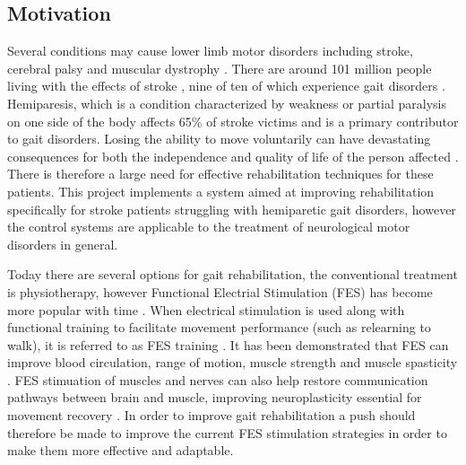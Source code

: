 



\subsection{Motivation}

Several conditions may cause lower limb motor disorders including stroke, cerebral palsy and muscular dystrophy \cite{hayami_development_2022}. There are around 101 million people living with the effects of stroke \cite{noauthor_key_nodate}, nine of ten of which experience gait disorders \cite{schaechter_motor_2004}. Hemiparesis, which is a condition characterized by weakness or partial paralysis on one side of the body affects 65\% of stroke victims \cite{wist_muscle_2016} and is a primary contributor to gait disorders. Losing the ability to move voluntarily can have devastating consequences for both the independence and quality of life of the person affected \cite{marquez-chin_functional_2020}. There is therefore a large need for effective rehabilitation techniques for these patients. This project implements a system aimed at improving rehabilitation specifically for stroke patients struggling with hemiparetic gait disorders, however the control systems are applicable to the treatment of neurological motor disorders in general.

Today there are several options for gait rehabilitation, the conventional treatment is physiotherapy, however Functional Electrial Stimulation (FES) has become more popular with time \cite{muller_adaptive_2020}. When electrical stimulation is used along with functional training to facilitate movement performance (such as relearning to walk), it is referred to as FES training \cite{hayami_development_2022}. It has been demonstrated that FES can improve blood circulation, range of motion, muscle strength and muscle spasticity \cite{luo_review_2020}. FES stimuation of muscles and nerves can also help restore communication pathways between brain and muscle, improving neuroplasticity essential for movement recovery \cite{marquez-chin_functional_2020}. In order to improve gait rehabilitation a push should therefore be made to improve the current FES stimulation strategies in order to make them more effective and adaptable.


